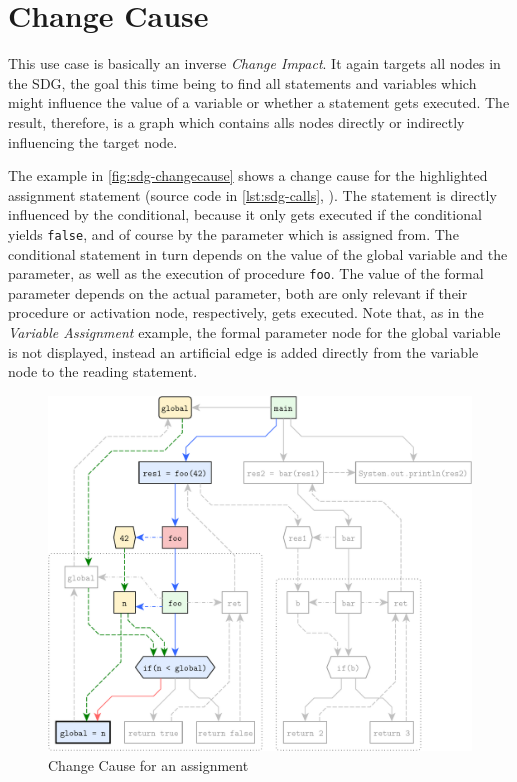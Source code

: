 

\section{Change Cause}

This use case is basically an inverse \emph{Change Impact}. It again targets all nodes in the SDG, the goal this time 
being to find all statements and variables which might influence the value of a variable or whether a statement gets 
executed. The result, therefore, is a graph which contains alls nodes directly or indirectly influencing the target 
node.

The example in \autoref{fig:sdg-changecause} shows a change cause for the highlighted assignment statement (source code 
in \autoref{lst:sdg-calls}, ). The statement is directly influenced by the conditional, 
because it only gets executed if the conditional yields \lstinline|false|, and of course by the parameter which is 
assigned from. The conditional statement in turn depends on the value of the global variable and the parameter, as well 
as the execution of procedure \lstinline|foo|. The value of the formal parameter depends on the actual parameter, both 
are only relevant if their procedure or activation node, respectively, gets executed. Note that, as in the 
\emph{Variable Assignment} example, the formal parameter node for the global variable is not displayed, instead an 
artificial edge is added directly from the variable node to the reading statement.

\begin{figure}[htbp]
  \centering
    \includegraphics[scale=0.6]{sdgs/changecause}
  \caption{Change Cause for an assignment}
  \label{fig:sdg-changecause}
\end{figure}
